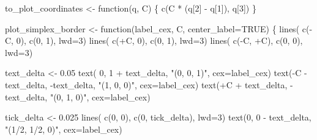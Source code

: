 \documentclass[
  letterpaper,
  DIV=11,
  numbers=noendperiod]{scrartcl}
\newenvironment{Shaded}{\begin{snugshade}}{\end{snugshade}}
\newcommand{\AttributeTok}[1]{\textcolor[rgb]{0.40,0.45,0.13}{#1}}
\newcommand{\ConstantTok}[1]{\textcolor[rgb]{0.56,0.35,0.01}{#1}}
\newcommand{\ControlFlowTok}[1]{\textcolor[rgb]{0.00,0.23,0.31}{#1}}
\newcommand{\DecValTok}[1]{\textcolor[rgb]{0.68,0.00,0.00}{#1}}
\newcommand{\FloatTok}[1]{\textcolor[rgb]{0.68,0.00,0.00}{#1}}
\newcommand{\FunctionTok}[1]{\textcolor[rgb]{0.28,0.35,0.67}{#1}}
\newcommand{\NormalTok}[1]{\textcolor[rgb]{0.00,0.23,0.31}{#1}}
\newcommand{\OtherTok}[1]{\textcolor[rgb]{0.00,0.23,0.31}{#1}}
\newcommand{\SpecialCharTok}[1]{\textcolor[rgb]{0.37,0.37,0.37}{#1}}
\newcommand{\StringTok}[1]{\textcolor[rgb]{0.13,0.47,0.30}{#1}}
\begin{document}
\begin{Shaded}
\begin{Highlighting}[]
\NormalTok{to\_plot\_coordinates }\OtherTok{\textless{}{-}} \ControlFlowTok{function}\NormalTok{(q, C) \{}
  \FunctionTok{c}\NormalTok{(C }\SpecialCharTok{*}\NormalTok{ (q[}\DecValTok{2}\NormalTok{] }\SpecialCharTok{{-}}\NormalTok{ q[}\DecValTok{1}\NormalTok{]), q[}\DecValTok{3}\NormalTok{])}
\NormalTok{\}}

\NormalTok{plot\_simplex\_border }\OtherTok{\textless{}{-}} \ControlFlowTok{function}\NormalTok{(label\_cex, C, }\AttributeTok{center\_label=}\ConstantTok{TRUE}\NormalTok{) \{}
  \FunctionTok{lines}\NormalTok{( }\FunctionTok{c}\NormalTok{(}\SpecialCharTok{{-}}\NormalTok{C, }\DecValTok{0}\NormalTok{), }\FunctionTok{c}\NormalTok{(}\DecValTok{0}\NormalTok{, }\DecValTok{1}\NormalTok{), }\AttributeTok{lwd=}\DecValTok{3}\NormalTok{)}
  \FunctionTok{lines}\NormalTok{( }\FunctionTok{c}\NormalTok{(}\SpecialCharTok{+}\NormalTok{C, }\DecValTok{0}\NormalTok{), }\FunctionTok{c}\NormalTok{(}\DecValTok{0}\NormalTok{, }\DecValTok{1}\NormalTok{), }\AttributeTok{lwd=}\DecValTok{3}\NormalTok{)}
  \FunctionTok{lines}\NormalTok{( }\FunctionTok{c}\NormalTok{(}\SpecialCharTok{{-}}\NormalTok{C, }\SpecialCharTok{+}\NormalTok{C), }\FunctionTok{c}\NormalTok{(}\DecValTok{0}\NormalTok{, }\DecValTok{0}\NormalTok{), }\AttributeTok{lwd=}\DecValTok{3}\NormalTok{)}

\NormalTok{  text\_delta }\OtherTok{\textless{}{-}} \FloatTok{0.05}
  \FunctionTok{text}\NormalTok{( }\DecValTok{0}\NormalTok{, }\DecValTok{1} \SpecialCharTok{+}\NormalTok{ text\_delta, }\StringTok{"(0, 0, 1)"}\NormalTok{, }\AttributeTok{cex=}\NormalTok{label\_cex)}
  \FunctionTok{text}\NormalTok{(}\SpecialCharTok{{-}}\NormalTok{C }\SpecialCharTok{{-}}\NormalTok{ text\_delta, }\SpecialCharTok{{-}}\NormalTok{text\_delta, }\StringTok{"(1, 0, 0)"}\NormalTok{, }\AttributeTok{cex=}\NormalTok{label\_cex)}
  \FunctionTok{text}\NormalTok{(}\SpecialCharTok{+}\NormalTok{C }\SpecialCharTok{+}\NormalTok{ text\_delta, }\SpecialCharTok{{-}}\NormalTok{text\_delta, }\StringTok{"(0, 1, 0)"}\NormalTok{, }\AttributeTok{cex=}\NormalTok{label\_cex)}

\NormalTok{  tick\_delta }\OtherTok{\textless{}{-}} \FloatTok{0.025}
  \FunctionTok{lines}\NormalTok{( }\FunctionTok{c}\NormalTok{(}\DecValTok{0}\NormalTok{, }\DecValTok{0}\NormalTok{), }\FunctionTok{c}\NormalTok{(}\DecValTok{0}\NormalTok{, tick\_delta), }\AttributeTok{lwd=}\DecValTok{3}\NormalTok{)}
  \FunctionTok{text}\NormalTok{(}\DecValTok{0}\NormalTok{, }\DecValTok{0} \SpecialCharTok{{-}}\NormalTok{ text\_delta, }\StringTok{"(1/2, 1/2, 0)"}\NormalTok{, }\AttributeTok{cex=}\NormalTok{label\_cex)}


\end{Highlighting}
\end{Shaded}
\end{document}
